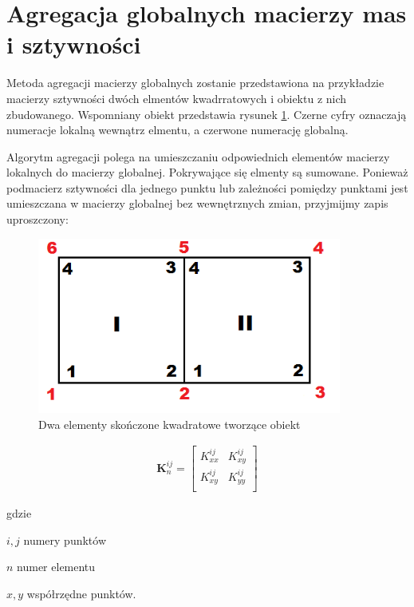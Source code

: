 
\section{Agregacja globalnych macierzy mas i sztywności}
\label{sec:agregacja}

Metoda agregacji macierzy globalnych zostanie przedstawiona na przykładzie macierzy sztywności dwóch elmentów kwadrratowych i obiektu z nich zbudowanego. Wspomniany obiekt przedstawia rysunek \ref{fig:agreg}. Czerne cyfry oznaczają numeracje lokalną wewnątrz elmentu, a czerwone numerację globalną.

Algorytm agregacji polega na umieszczaniu odpowiednich elementów macierzy lokalnych do macierzy globalnej. Pokrywające się elmenty są sumowane. Ponieważ podmacierz sztywności dla jednego punktu lub zależności pomiędzy punktami jest umieszczana w macierzy globalnej bez wewnętrznych zmian, przyjmijmy zapis uproszczony:

\begin{figure}[h]
\centering
\includegraphics[width=10cm]{Zdjecia/3/agregacja}
\caption{Dwa elementy skończone kwadratowe tworzące obiekt}
\label{fig:agreg}
\end{figure}

\begin{gather}
	\textbf{K}_n^{ij} = \begin{bmatrix} 
	 	K^{ij}_{xx} & K^{ij}_{xy} \\
	 	K^{ij}_{xy} & K^{ij}_{yy} \\
	\end{bmatrix}
\end{gather}

gdzie
\begin{eqwhere}[2cm]
	\item[$i, j$] numery punktów
	\item[$n$] numer elementu
	\item[$x, y$] współrzędne punktów.
\end{eqwhere}

